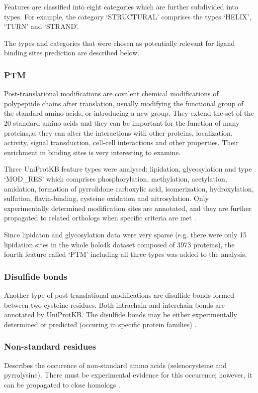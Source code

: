 Features are classified into eight categories which are further subdivided into types. For example, the category `STRUCTURAL' comprises the types `HELIX', `TURN' and `STRAND'.

The types and categories that were chosen as potentially relevant for ligand binding sites prediction are described below.


\subsubsection{PTM}
Post-translational modifications are covalent chemical modifications of polypeptide chains after translation, usually modifying the functional group of the standard amino acids, or introducing a new group. They extend the set of the 20 standard amino acids and they can be important for the function of many proteins,as they can alter the interactions with other proteins, localization, activity, signal transduction, cell-cell interactions and other properties. Their enrichment in binding sites is very interesting to examine.

Three UniProtKB feature types were analysed: lipidation, glycosylation and type `MOD\_RES' which comprises phosphorylation, methylation, acetylation, amidation, formation of pyrrolidone carboxylic acid, isomerization, hydroxylation, sulfation, flavin-binding, cysteine oxidation and nitrosylation. Only experimentally determined modification sites are annotated, and they are further propagated to related orthologs when specific criteria are met \cite{mod_res}.

Since lipidaton and glycosylation data were very sparse (e.g. there were only 15 lipidation sites in the whole holo4k dataset composed of 3973 proteins), the fourth feature called `PTM' including all three types was added to the analysis.

\subsubsection{Disulfide bonds}
Another type of post-translational modifications are disulfide bonds formed between two cysteine residues. Both intrachain and interchain bonds are annotated by \mbox{UniProtKB}. The disulfide bonds may be either experimentally determined or predicted (occuring in specific protein families) \cite{disulfid}.

\subsubsection{Non-standard residues}
Describes the occurence of non-standard amino acids (selenocysteine and pyrrolysine). There must be experimental evidence for this occurence; however, it can be propagated to close homologs \cite{non_std}.

